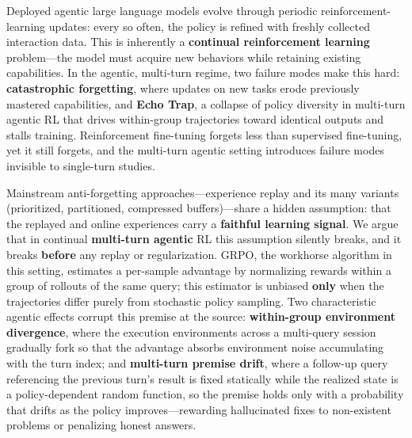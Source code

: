 \begin{abstracten}
Deployed agentic large language models evolve through periodic reinforcement-learning updates: every so often, the policy is refined with freshly collected interaction data. This is inherently a \textbf{continual reinforcement learning} problem---the model must acquire new behaviors while retaining existing capabilities. In the agentic, multi-turn regime, two failure modes make this hard: \textbf{catastrophic forgetting}, where updates on new tasks erode previously mastered capabilities, and \textbf{Echo Trap}, a collapse of policy diversity in multi-turn agentic RL that drives within-group trajectories toward identical outputs and stalls training. Reinforcement fine-tuning forgets less than supervised fine-tuning, yet it still forgets, and the multi-turn agentic setting introduces failure modes invisible to single-turn studies.

Mainstream anti-forgetting approaches---experience replay and its many variants (prioritized, partitioned, compressed buffers)---share a hidden assumption: that the replayed and online experiences carry a \textbf{faithful learning signal}. We argue that in continual \textbf{multi-turn agentic} RL this assumption silently breaks, and it breaks \textbf{before} any replay or regularization. GRPO, the workhorse algorithm in this setting, estimates a per-sample advantage by normalizing rewards within a group of rollouts of the same query; this estimator is unbiased \textbf{only} when the trajectories differ purely from stochastic policy sampling. Two characteristic agentic effects corrupt this premise at the source: \textbf{within-group environment divergence}, where the execution environments across a multi-query session gradually fork so that the advantage absorbs environment noise accumulating with the turn index; and \textbf{multi-turn premise drift}, where a follow-up query referencing the previous turn's result is fixed statically while the realized state is a policy-dependent random function, so the premise holds only with a probability that drifts as the policy improves---rewarding hallucinated fixes to non-existent problems or penalizing honest answers.


\end{abstracten}
